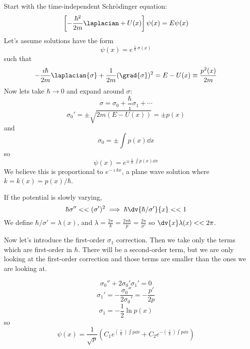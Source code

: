 \documentclass[a4paper,twoside,master.tex]{subfiles}
\begin{document}
Start with the time-independent Schr\"odinger equation:
\begin{equation}
    \left[- \frac{\hbar^2}{2m} \laplacian + U(x)\right] \psi(x) = E \psi(x) 
\end{equation}
Let's assume solutions have the form
\begin{equation}
    \psi(x) = e^{\frac{\imath}{\hbar} \sigma(x)}
\end{equation}
such that
\begin{equation}
    - \frac{\imath \hbar}{2m} \laplacian{\sigma} + \frac{1}{2m} (\grad{\sigma})^2 = E - U(x) \equiv \frac{p^2(x)}{2m}
\end{equation}
Now lets take $ \hbar \to 0 $ and expand around $ \sigma $:
\begin{equation}
    \sigma = \sigma_0 + \frac{\hbar}{\imath} \sigma_1 + \cdots
\end{equation}
\begin{equation}
    \sigma_0' = \pm \sqrt{2m(E-U(x))} = \pm p(x)
\end{equation}
and
\begin{equation}
    \sigma_0 = \pm \int p(x) \dd{x}
\end{equation}
so
\begin{equation}
    \psi(x) = e^{\pm\frac{\imath}{\hbar} \int p(x) \dd{x}}
\end{equation}
We believe this is proportional to $ e^{- \imath k x} $, a plane wave solution where $ k = k(x) = p(x) / \hbar $.

If the potential is slowly varying,
\begin{equation}
    \hbar \sigma'' << (\sigma')^2 \implies \hbar \dv{\hbar / \sigma'}{x} << 1
\end{equation}
We define $ \hbar / \sigma' = \lambda(x) $, and $ \lambda = \frac{2 \pi}{k} = \frac{2 \pi \hbar}{p} = \frac{2 \pi}{\sigma'} $ so $ \dv{x} \lambda(x) << 2 \pi $.

Now let's introduce the first-order $ \sigma_1 $ correction. Then we take only the terms which are first-order in $ \hbar $. There will be a second-order term, but we are only looking at the first-order correction and those terms are smaller than the ones we are looking at.

\begin{equation}
    \sigma_0'' + 2 \sigma_0' \sigma_1' = 0
\end{equation}
\begin{equation}
    \sigma_1' = - \frac{\sigma_0''}{2\sigma_0'} = - \frac{p'}{2p}
\end{equation}
\begin{equation}
    \sigma_1 = - \frac{1}{2} \ln{p(x)}
\end{equation}
so
\begin{equation}
    \psi(x) = \frac{1}{\sqrt{p}} \left( C_1 e^{(\frac{\imath}{\hbar}) \int p \dd{x}} + C_2 e^{-(\frac{\imath}{\hbar}) \int p \dd{x}} \right)
\end{equation}
\end{document}
